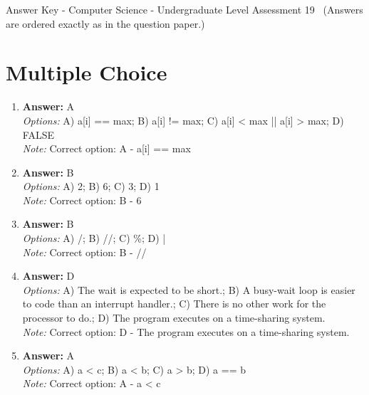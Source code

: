 \documentclass[12pt]{article}
\begin{document}
\begin{center}
Answer Key - Computer Science - Undergraduate Level Assessment 19 \
\small (Answers are ordered exactly as in the question paper.)
\end{center}

\section*{Multiple Choice}
\begin{enumerate}[label=\arabic*.]
\item \textbf{Answer:} A
\\ \textit{Options:} A) a[i] == max; B) a[i] != max; C) a[i] \textless{} max || a[i] \textgreater{} max; D) FALSE
\\ \textit{Note:} Correct option: A - a[i] == max
\item \textbf{Answer:} B
\\ \textit{Options:} A) 2; B) 6; C) 3; D) 1
\\ \textit{Note:} Correct option: B - 6
\item \textbf{Answer:} B
\\ \textit{Options:} A) /; B) //; C) \%; D) |
\\ \textit{Note:} Correct option: B - //
\item \textbf{Answer:} D
\\ \textit{Options:} A) The wait is expected to be short.; B) A busy-wait loop is easier to code than an interrupt handler.; C) There is no other work for the processor to do.; D) The program executes on a time-sharing system.
\\ \textit{Note:} Correct option: D - The program executes on a time-sharing system.
\item \textbf{Answer:} A
\\ \textit{Options:} A) a \textless{} c; B) a \textless{} b; C) a \textgreater{} b; D) a == b
\\ \textit{Note:} Correct option: A - a \textless{} c
\end{enumerate}
\end{document}
